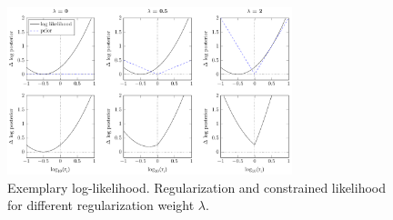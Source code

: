 \documentclass{bioinfo}
\begin{document}
\begin{figure}[!tpb]%
\centerline{\includegraphics[width=235pt]{Figures/l1_cartoon_priorstrength.pdf}}
\caption{Exemplary log-likelihood. Regularization and constrained likelihood for different regularization weight $\lambda$.}\label{fig:02}
\end{figure}
\end{document}
